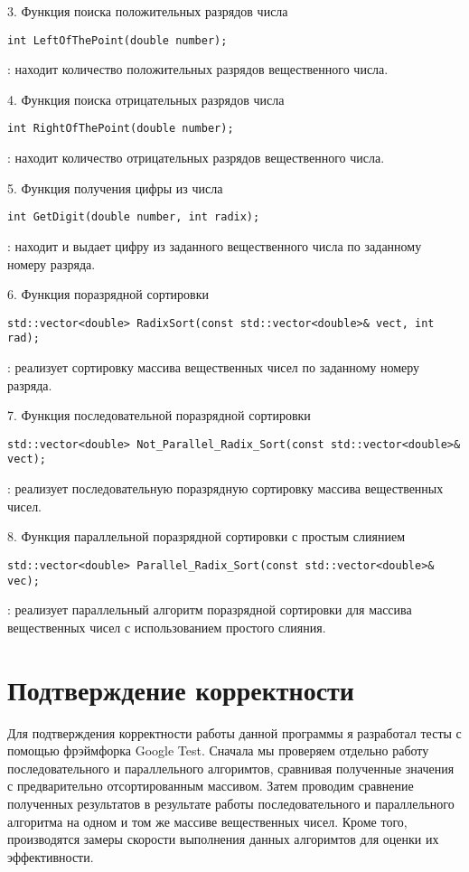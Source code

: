 \documentclass[12pt]{report}
\begin{document}
\par 3. Функция поиска положительных разрядов числа
\begin{lstlisting}
int LeftOfThePoint(double number);
\end{lstlisting}
: находит количество положительных разрядов вещественного числа.

\par 4. Функция поиска отрицательных разрядов числа
\begin{lstlisting}
int RightOfThePoint(double number);
\end{lstlisting}
: находит количество отрицательных разрядов вещественного числа.

\par 5. Функция получения цифры из числа
\begin{lstlisting}
int GetDigit(double number, int radix);
\end{lstlisting}
: находит и выдает цифру из заданного вещественного числа по заданному номеру разряда.

\par 6. Функция поразрядной сортировки
\begin{lstlisting}
std::vector<double> RadixSort(const std::vector<double>& vect, int rad);
\end{lstlisting}
: реализует сортировку массива вещественных чисел по заданному номеру разряда.

\par 7. Функция последовательной поразрядной сортировки
\begin{lstlisting}
std::vector<double> Not_Parallel_Radix_Sort(const std::vector<double>& vect);
\end{lstlisting}
: реализует последовательную поразрядную сортировку массива вещественных чисел.

\par 8. Функция параллельной поразрядной сортировки с простым слиянием
\begin{lstlisting}
std::vector<double> Parallel_Radix_Sort(const std::vector<double>& vec);
\end{lstlisting}
: реализует параллельный алгоритм поразрядной сортировки для массива вещественных чисел с использованием простого слияния.

\newpage

\section*{Подтверждение корректности}
Для подтверждения корректности работы данной программы я разработал тесты с помощью фрэймфорка Google Test. Сначала мы проверяем отдельно работу последовательного и параллельного алгоримтов, сравнивая полученные значения с предварительно отсортированным массивом. Затем проводим сравнение полученных результатов в результате работы последовательного и параллельного алгоритма на одном и том же массиве вещественных чисел. Кроме того, производятся замеры скорости выполнения данных алгоримтов для оценки их эффективности.
\end{document}
